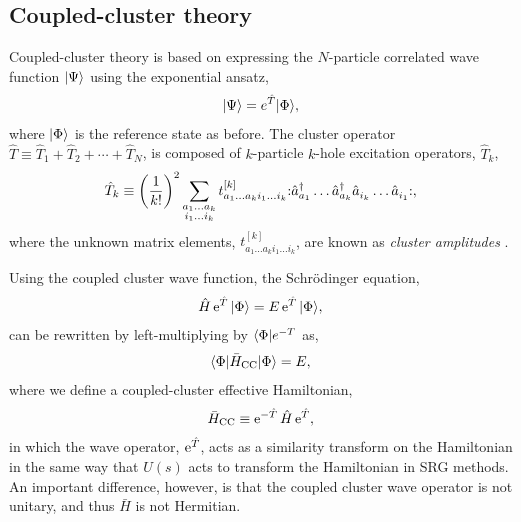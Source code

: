 \subsection{Coupled-cluster theory}
\label{subsec:cctheory}

Coupled-cluster theory is based on expressing the $N$-particle correlated wave function $| \Psi \rangle$ using the exponential ansatz,
\begin{align*}
  | \Psi \rangle = e^{\hat{T}} | \Phi \rangle,
\end{align*}
where $| \Phi \rangle$ is the reference state as before.  The cluster operator $\hat{T} \equiv \hat{T}_1 + \hat{T}_2 + \cdots + \hat{T}_N$, is composed of $k$-particle $k$-hole excitation operators, $\hat{T}_k$,
\begin{align} \label{eq:cc_amps}
  \hat{T}_k \equiv \left(\frac{1}{k!}\right)^2 \sum_{\substack{a_1 \ldots a_k \\ i_1 \ldots i_k}} t^{[k]}_{a_1 \ldots a_k i_1 \ldots i_k} \mathopen: \hat{a}_{a_1}^\dagger \ldots \hat{a}_{a_k}^\dagger \hat a_{i_k}^{} \ldots \hat{a}_{i_1}^{} \mathclose:,
\end{align}
where the unknown matrix elements, $t^{[k]}_{a_1 \ldots a_k i_1 \ldots i_k}$, are known as \textit{cluster amplitudes} \cite{shavitt2009many}.

Using the coupled cluster wave function, the Schr\"odinger equation,
\begin{align} \label{eq:cc_schrodeq}
  \hat{H} \operatorname{e}^{\hat{T}} | \Phi \rangle = E \operatorname{e}^{\hat{T}} | \Phi \rangle,
\end{align}
can be rewritten by left-multiplying by $\langle \Phi |e^{-T}$ as,
\begin{align*}
  \langle \Phi | \bar{H}_{\mathrm{CC}} | \Phi \rangle = E,
\end{align*}
where we define a coupled-cluster effective Hamiltonian,
\begin{align} \label{eq:cc_heff0}
  \bar{H}_{\mathrm{CC}} \equiv \operatorname{e}^{-\hat{T}} \hat{H} \operatorname{e}^{\hat{T}},
\end{align}
in which the wave operator, $\operatorname{e}^{\hat{T}}$, acts as a similarity transform on the Hamiltonian in the same way that $\hat{U}(s)$ acts to transform the Hamiltonian in SRG methods.  An important difference, however, is that the coupled cluster wave operator is not unitary, and thus $\bar{H}$ is not Hermitian.

